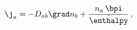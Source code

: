 \begin{equation} \label{eq:susyJ}
   \j_a = -D_{ab}\grad n_b +
   \frac{n_a \,\bpi}{\bar\enthalpy} \,,
\end{equation}

